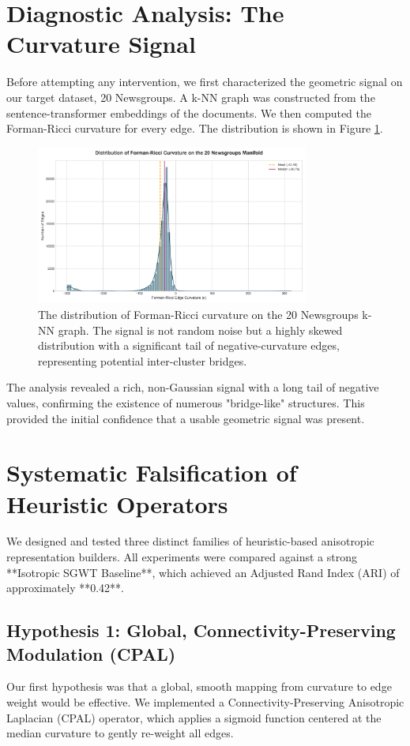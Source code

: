 \documentclass[11pt, a4paper]{article}
\begin{document}
\section{Diagnostic Analysis: The Curvature Signal}

Before attempting any intervention, we first characterized the geometric signal on our target dataset, 20 Newsgroups. A k-NN graph was constructed from the sentence-transformer embeddings of the documents. We then computed the Forman-Ricci curvature for every edge. The distribution is shown in Figure \ref{fig:curvature_dist}.

\begin{figure}[h!]
    \centering
    \includegraphics[width=0.8\textwidth]{../paper/figures/curvature_distribution.png}
    \caption{The distribution of Forman-Ricci curvature on the 20 Newsgroups k-NN graph. The signal is not random noise but a highly skewed distribution with a significant tail of negative-curvature edges, representing potential inter-cluster bridges.}
    \label{fig:curvature_dist}
\end{figure}

The analysis revealed a rich, non-Gaussian signal with a long tail of negative values, confirming the existence of numerous "bridge-like" structures. This provided the initial confidence that a usable geometric signal was present.

\section{Systematic Falsification of Heuristic Operators}

We designed and tested three distinct families of heuristic-based anisotropic representation builders. All experiments were compared against a strong **Isotropic SGWT Baseline**, which achieved an Adjusted Rand Index (ARI) of approximately **0.42**.

\subsection{Hypothesis 1: Global, Connectivity-Preserving Modulation (CPAL)}
Our first hypothesis was that a global, smooth mapping from curvature to edge weight would be effective. We implemented a Connectivity-Preserving Anisotropic Laplacian (CPAL) operator, which applies a sigmoid function centered at the median curvature to gently re-weight all edges.
\end{document}

